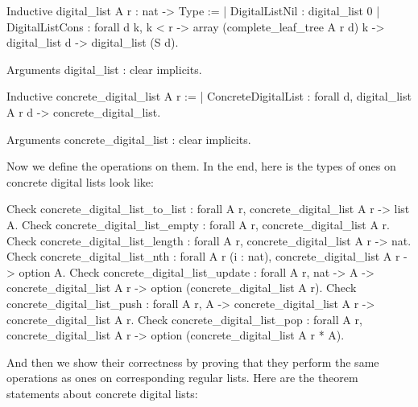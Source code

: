 \documentclass{article}
\begin{document}
\begin{coq}
Inductive digital_list {A r} : nat -> Type :=
  | DigitalListNil : digital_list 0
  | DigitalListCons :
      forall {d} k,
      k < r ->
      array (complete_leaf_tree A r d) k ->
      digital_list d ->
      digital_list (S d).

Arguments digital_list : clear implicits.

Inductive concrete_digital_list {A r} :=
  | ConcreteDigitalList : forall d, digital_list A r d -> concrete_digital_list.

Arguments concrete_digital_list : clear implicits.
\end{coq}

Now we define the operations on them. In the end, here is the types of ones on concrete digital lists look like:

\begin{coq}
Check concrete_digital_list_to_list : forall {A} {r}, concrete_digital_list A r -> list A.
Check concrete_digital_list_empty : forall {A} {r}, concrete_digital_list A r.
Check concrete_digital_list_length : forall {A} {r}, concrete_digital_list A r -> nat.
Check concrete_digital_list_nth : forall {A} {r} (i : nat), concrete_digital_list A r -> option A.
Check concrete_digital_list_update : forall {A} {r}, nat -> A -> concrete_digital_list A r ->
  option (concrete_digital_list A r).
Check concrete_digital_list_push : forall {A} {r}, A -> concrete_digital_list A r -> concrete_digital_list A r.
Check concrete_digital_list_pop : forall {A} {r}, concrete_digital_list A r ->
  option (concrete_digital_list A r * A).
\end{coq} \pagebreak%

And then we show their correctness by proving that they perform the same operations as ones on corresponding regular lists. Here are the theorem statements about concrete digital lists:
\end{document}
